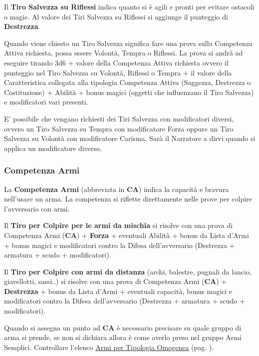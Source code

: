 \begin{multicols}{2}
Il \textbf{Tiro Salvezza su Riflessi} indica quanto si è agili e pronti per evitare ostacoli o magie. Al valore dei Tiri Salvezza su Riflessi si aggiunge il punteggio di \textbf{Destrezza}.

Quando viene chiesto un Tiro Salvezza significa fare una prova sulla Competenza Attiva richiesta, possa essere Volontà, Tempra o Riflessi.
La prova si andrà ad eseguire tirando 3d6 + valore della Competenza Attiva richiesta ovvero il punteggio nel Tiro Salvezza su Volontà, Riflessi o Tempra + il valore della Caratteristica collegata alla tipologia Competenza Attiva (Saggezza, Destrezza o Costituzione) + Abilità + bonus magici (oggetti che influenzano il Tiro Salvezza) e modificatori vari presenti.

\medskip

\begin{giocatore}
E' possibile che vengano richiesti dei Tiri Salvezza con modificatori diversi, ovvero un Tiro Salvezza su Tempra con modificatore Forza oppure un Tiro Salvezza su Volontà con modificatore Carisma. Sarà il Narratore a dirvi quando si applica un modificatore diverso.
\end{giocatore}

\subsubsection{Competenza Armi}\label{competenzaarmi}

La \textbf{Competenza Armi} (abbreviata in \textbf{CA}) indica la capacità e bravura nell'usare un arma. La competenza si riflette direttamente nelle prove per colpire l'avversario con armi.

Il \textbf{Tiro per Colpire per le armi da mischia} si risolve con una prova di Competenza Armi (\textbf{CA}) + \textbf{Forza} + eventuali Abilità + bonus da Lista d'Armi + bonus magici e modificatori contro la Difesa dell'avversario (Destrezza + armatura + scudo + modificatori).

Il \textbf{Tiro per Colpire con armi da distanza} (archi, balestre, pugnali da lancio, giavellotti, sassi..) si risolve con una prova di Competenza Armi (\textbf{CA}) + \textbf{Destrezza} + bonus da Lista d'Armi + eventuali capacità, bonus magici e modificatori contro la Difesa dell'avversario (Destrezza + armatura + scudo + modificatori).

Quando si assegna un punto ad \textbf{CA} è necessario precisare su quale gruppo di arma si prende, se non si dichiara allora è come averlo preso nel gruppo Armi Semplici.
Controllare l'elenco \hyperlink{lista.armi}{Armi per Tipologia Omogenea} (pag. \pageref{lista.armi}).


\end{multicols}
